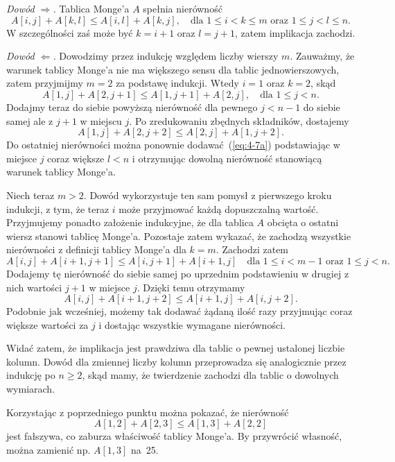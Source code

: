 
\subexercise{} %
\noindent\emph{Dowód $\Rightarrow$.} Tablica Monge'a $A$ spełnia nierówność
\[
	A[i,j]+A[k,l] \le A[i,l]+A[k,j], \quad\text{dla $1\le i<k\le m$ oraz $1\le j<l\le n$}.
\]
W szczególności zaś może być $k=i+1$ oraz $l=j+1$, zatem implikacja zachodzi.
\bigskip

\noindent\emph{Dowód $\Leftarrow$.} Dowodzimy przez indukcję względem liczby wierszy $m$. Zauważmy, że warunek tablicy Monge'a nie ma większego sensu dla tablic jednowierszowych, zatem przyjmijmy $m=2$ za podstawę indukcji. Wtedy $i=1$ oraz $k=2$, skąd
\begin{equation}
	A[1,j]+A[2,j+1] \le A[1,j+1]+A[2,j], \quad\text{dla $1\le j<n$}. \label{eq:4-7a}
\end{equation}
Dodajmy teraz do siebie powyższą nierówność dla pewnego $j<n-1$ do siebie samej ale z $j+1$ w miejscu $j$. Po zredukowaniu zbędnych składników, dostajemy
\[
	A[1,j]+A[2,j+2] \le A[2,j]+A[1,j+2].
\]
Do ostatniej nierówności można ponownie dodawać~(\ref{eq:4-7a}) podstawiając w miejsce $j$ coraz większe $l<n$ i otrzymując dowolną nierówność stanowiącą warunek tablicy Monge'a.

Niech teraz $m>2$. Dowód wykorzystuje ten sam pomysł z pierwszego kroku indukcji, z tym, że teraz $i$ może przyjmować każdą dopuszczalną wartość. Przyjmujemy ponadto założenie indukcyjne, że dla tablica $A$ obcięta o ostatni wiersz stanowi tablicę Monge'a. Pozostaje zatem wykazać, że zachodzą wszystkie nierówności z definicji tablicy Monge'a dla $k=m$. Zachodzi zatem
\[
	A[i,j]+A[i+1,j+1] \le A[i,j+1]+A[i+1,j] \quad\text{dla $1\le i<m-1$ oraz $1\le j<n$}.
\]
Dodajemy tę nierówność do siebie samej po uprzednim podstawieniu w drugiej z nich wartości $j+1$ w miejsce $j$. Dzięki temu otrzymamy
\[
	A[i,j]+A[i+1,j+2] \le A[i+1,j]+A[i,j+2].
\]
Podobnie jak wcześniej, możemy tak dodawać żądaną ilość razy przyjmując coraz większe wartości za $j$ i dostając wszystkie wymagane nierówności.

Widać zatem, że implikacja jest prawdziwa dla tablic o pewnej ustalonej liczbie kolumn. Dowód dla zmiennej liczby kolumn przeprowadza się analogicznie przez indukcję po $n\ge2$, skąd mamy, że twierdzenie zachodzi dla tablic o dowolnych wymiarach.

\subexercise{} %
Korzystając z poprzedniego punktu można pokazać, że nierówność
\[
	A[1,2]+A[2,3] \le A[1,3]+A[2,2]
\]
jest fałszywa, co zaburza właściwość tablicy Monge'a. By przywrócić własność, można zamienić np. $A[1,3]$ na~25.


